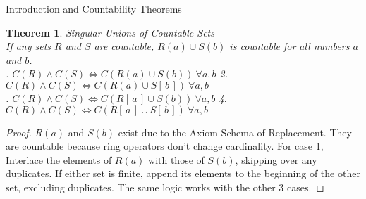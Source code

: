 \documentclass[12pt]{article}
\newtheorem{thm}{Theorem}
\begin{document}
\begin{section}{Introduction and Countability Theorems}
	\begin{thm}\label{thm:finite unions}
		\emph{
			Singular Unions of Countable Sets\\
			\indent If any sets $R$ and $S$ are countable, $R(a)\cup S(b)$ is countable
			for all numbers $a$ and $b$.\vspace{0.4em}\\
			. $C(R)\land C(S)\iff C(R\left(a\right)\cup S\left(b\right))~\forall a,b$
			\hspace{1em}
			2. $C(R)\land C(S)\iff C(R\left(a\right)\cup S[\,b\,])~\forall a,b$\\
			. $C(R)\land C(S)\iff C(R[\,a\,]\cup S\left(b\right))~\forall a,b$
			\hspace{1em}
			4. $C(R)\land C(S)\iff C(R[\,a\,]\cup S[\,b\,])~\forall a,b$
		}
	\end{thm}\begin{proof}
		$R(a)$ and $S(b)$ exist due to the Axiom Schema of Replacement. They are countable because ring
		operators don't change cardinality. For case 1, Interlace the elements of $R(a)$ with those
		of $S(b)$, skipping over any duplicates. If either set is finite, append its elements to the
		beginning of the other set, excluding duplicates. The same logic works with the other 3 cases.
	\end{proof}


\end{section}
\end{document}
